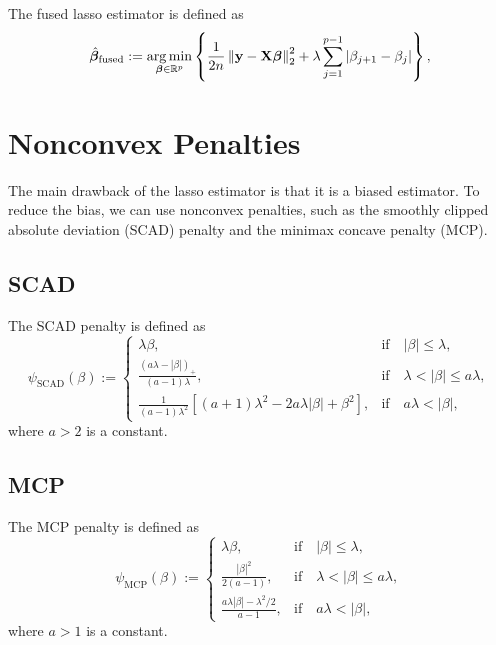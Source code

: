 The fused lasso estimator is defined as
\begin{equation*}
	\hat{\boldsymbol{\beta}}_{\text{fused}}:=\underset{\boldsymbol{\beta}\in{\mathbb R}^{p}}{\arg\min}\left\{\frac{1}{2n}\left\|{\bf y}-{\bf X}\boldsymbol{\beta}\right\|_{2}^{2}+\lambda\sum_{j=1}^{p-1}\left|\beta_{j+1}-\beta_{j}\right|\right\},
\end{equation*}

\section{Nonconvex Penalties}

The main drawback of the lasso estimator is that it is a biased estimator. To reduce the bias, we can use nonconvex penalties, such as the smoothly clipped absolute deviation (SCAD) penalty and the minimax concave penalty (MCP).

\subsection{SCAD}

The SCAD penalty is defined as
\begin{equation*}
	\psi_{\text{SCAD}}(\beta):=\left\{\begin{array}{ll}
		\lambda\beta,                                                                                  & \text{if}\quad\left|\beta\right|\leq\lambda,           \\
		\frac{\left(a\lambda-\left|\beta\right|\right)_{+}}{(a-1)\lambda},                             & \text{if}\quad\lambda<\left|\beta\right|\leq a\lambda, \\
		\frac{1}{(a-1)\lambda^{2}}\left[(a+1)\lambda^{2}-2a\lambda\left|\beta\right|+\beta^{2}\right], & \text{if}\quad a\lambda<\left|\beta\right|,
	\end{array}\right.
\end{equation*}
where $a>2$ is a constant.

\subsection{MCP}

The MCP penalty is defined as
\begin{equation*}
	\psi_{\text{MCP}}(\beta):=\left\{\begin{array}{ll}
		\lambda\beta,                                         & \text{if}\quad\left|\beta\right|\leq\lambda,           \\
		\frac{\left|\beta\right|^{2}}{2(a-1)},                & \text{if}\quad\lambda<\left|\beta\right|\leq a\lambda, \\
		\frac{a\lambda\left|\beta\right|-\lambda^{2}/2}{a-1}, & \text{if}\quad a\lambda<\left|\beta\right|,
	\end{array}\right.
\end{equation*}
where $a>1$ is a constant.

